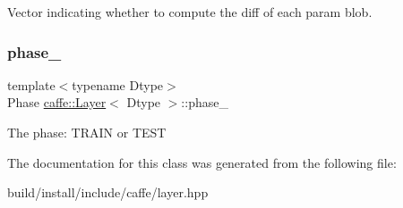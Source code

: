 Vector indicating whether to compute the diff of each param blob. \mbox{\label{classcaffe_1_1_layer_a1d04ad7f595a82a1c811f102d68b8a19}} 
\subsubsection{\texorpdfstring{phase\+\_\+}{phase\_}}
{\footnotesize\ttfamily template$<$typename Dtype$>$ \\
Phase \mbox{\hyperlink{classcaffe_1_1_layer}{caffe\+::\+Layer}}$<$ Dtype $>$\+::phase\+\_\+\hspace{0.3cm}{\ttfamily [protected]}}

The phase\+: T\+R\+A\+IN or T\+E\+ST 

The documentation for this class was generated from the following file\+:\begin{DoxyCompactItemize}
\item 
build/install/include/caffe/layer.\+hpp\end{DoxyCompactItemize}
